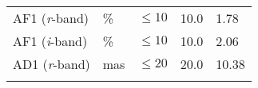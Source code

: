 \documentclass[DM,toc]{lsstdoc}
\begin{document}
\begin{longtable}[]{@{}lllll@{}}
\begin{minipage}[t]{0.19\columnwidth}\raggedright\strut
AF1 (\emph{r}-band)\strut
\end{minipage} & \begin{minipage}[t]{0.08\columnwidth}\raggedright\strut
\%\strut
\end{minipage} & \begin{minipage}[t]{0.20\columnwidth}\raggedright\strut
\(\leq 10\)\strut
\end{minipage} & \begin{minipage}[t]{0.22\columnwidth}\raggedright\strut
10.0\strut
\end{minipage} & \begin{minipage}[t]{0.17\columnwidth}\raggedright\strut
1.78\strut
\end{minipage}\tabularnewline
\begin{minipage}[t]{0.19\columnwidth}\raggedright\strut
AF1 (\emph{i}-band)\strut
\end{minipage} & \begin{minipage}[t]{0.08\columnwidth}\raggedright\strut
\%\strut
\end{minipage} & \begin{minipage}[t]{0.20\columnwidth}\raggedright\strut
\(\leq 10\)\strut
\end{minipage} & \begin{minipage}[t]{0.22\columnwidth}\raggedright\strut
10.0\strut
\end{minipage} & \begin{minipage}[t]{0.17\columnwidth}\raggedright\strut
2.06\strut
\end{minipage}\tabularnewline
\begin{minipage}[t]{0.19\columnwidth}\raggedright\strut
AD1 (\emph{r}-band)\strut
\end{minipage} & \begin{minipage}[t]{0.08\columnwidth}\raggedright\strut
mas\strut
\end{minipage} & \begin{minipage}[t]{0.20\columnwidth}\raggedright\strut
\(\leq 20\)\strut
\end{minipage} & \begin{minipage}[t]{0.22\columnwidth}\raggedright\strut
20.0\strut
\end{minipage} & \begin{minipage}[t]{0.17\columnwidth}\raggedright\strut
10.38\strut
\end{minipage}\tabularnewline
\begin{minipage}[t]{0.19\columnwidth}\raggedright\strut

\end{minipage}
\end{longtable}
\end{document}
